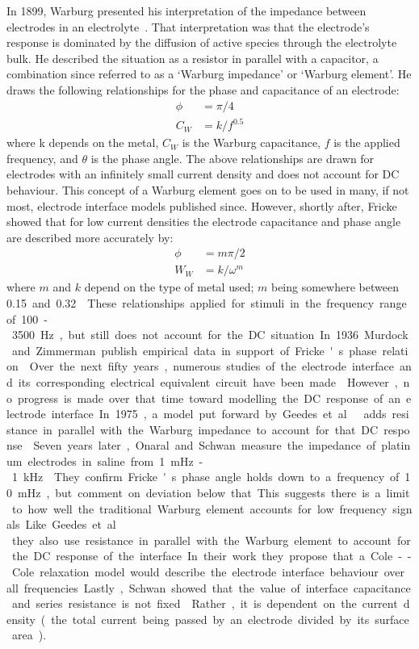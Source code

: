     In 1899, Warburg presented his interpretation of the impedance between electrodes in an electrolyte~\cite{Warburg1899}.
    That interpretation was that the electrode's response is dominated by the diffusion of active species through the electrolyte bulk.
    He described the situation as a resistor in parallel with a capacitor, a combination since referred to as a `Warburg impedance' or `Warburg element'.
    He draws the following relationships for the phase and capacitance of an electrode:
    \begin{align}
      \phi &= \pi / 4\\
      C_W &= k/f^{0.5}
    \end{align}
    where k depends on the metal, $C_W$ is the Warburg capacitance, $f$ is the applied frequency, and $\theta$ is the phase angle.
    The above relationships are drawn for electrodes with an infinitely small current density and does not account for DC behaviour.
    This concept of a Warburg element goes on to be used in many, if not most, electrode interface models published since.
    However, shortly after, Fricke showed that for low current densities the electrode capacitance and phase angle are described more accurately by:
    \begin{align}
      \phi &= m \pi / 2\\
      W_W &= k/\omega^m
    \end{align}
    where $m$ and $k$ depend on the type of metal used; $m$ being somewhere between \SI{0.15} and \SI{0.32}~\cite{Fricke1932}.
    These relationships applied for stimuli in the frequency range of \SI{100}-\SI{3500}{\hertz}, but still does not account for the DC situation.
    In 1936 Murdock and Zimmerman publish empirical data in support of Fricke's phase relation~\cite{Murdock1936}.
    Over the next fifty years, numerous studies of the electrode interface and its corresponding electrical equivalent circuit have been made~\cite{Randles1947,Epelboin1973,Sluyters-Rehbach1970}.
    However, no progress is made over that time toward modelling the DC response of an electrode interface.
    In 1975, a model put forward by Geedes et. al\ adds resistance in parallel with the Warburg impedance to account for that DC response~\cite{Geddes1975}.
    Seven years later, Onaral and Schwan measure the impedance of platinum electrodes in saline from \SI{1}{\milli\hertz}-\SI{1}{\kilo\hertz}~\cite{Onaral1982}.
    They confirm Fricke's phase angle holds down to a frequency of \SI{10}{\milli\hertz}, but comment on deviation below that.
    This suggests there is a limit to how well the traditional Warburg element accounts for low frequency signals.
    Like Geedes et. al\, they also use resistance in parallel with the Warburg element to account for the DC response of the interface.
    In their work they propose that a Cole--Cole relaxation model would describe the electrode interface behaviour over all frequencies.
    Lastly, Schwan showed that the value of interface capacitance and series resistance is not fixed~\cite{Schwan1968}.
    Rather, it is dependent on the current density (the total current being passed by an electrode divided by its surface area).

